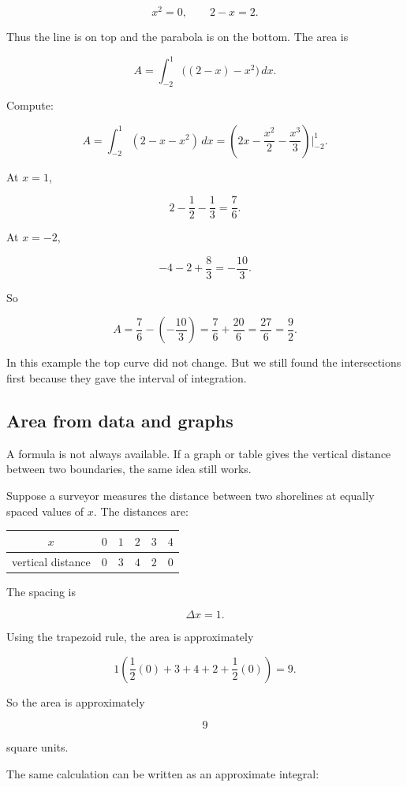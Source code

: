 \[
x^2=0,
\qquad
2-x=2.
\]

Thus the line is on top and the parabola is on the bottom.  The area is

\[
A=\int_{-2}^1 \bigl((2-x)-x^2\bigr)\,dx.
\]

Compute:

\[
A
=
\int_{-2}^1 (2-x-x^2)\,dx
=
\left(2x-\frac{x^2}{2}-\frac{x^3}{3}\right)\Big|_{-2}^{1}.
\]

At \(x=1\),

\[
2-\frac12-\frac13=\frac76.
\]

At \(x=-2\),

\[
-4-2+\frac83=-\frac{10}{3}.
\]

So

\[
A=\frac76-\left(-\frac{10}{3}\right)
=
\frac76+\frac{20}{6}
=
\boxed{\frac{27}{6}}
=
\boxed{\frac92}.
\]

In this example the top curve did not change.  But we still found the intersections first
because they gave the interval of integration.

\subsection{Area from data and graphs}
\label{subsec:area-from-data-and-graphs}

A formula is not always available.  If a graph or table gives the vertical distance between
two boundaries, the same idea still works.

Suppose a surveyor measures the distance between two shorelines at equally spaced
values of \(x\).  The distances are:

\begin{center}
\begin{tabular}{c|ccccc}
\(x\) & \(0\) & \(1\) & \(2\) & \(3\) & \(4\) \\ \hline
vertical distance & \(0\) & \(3\) & \(4\) & \(2\) & \(0\)
\end{tabular}
\end{center}

The spacing is

\[
\Delta x=1.
\]

Using the trapezoid rule, the area is approximately

\[
1\left(\frac12(0)+3+4+2+\frac12(0)\right)=9.
\]

So the area is approximately

\[
9
\]

square units.

The same calculation can be written as an approximate integral:

